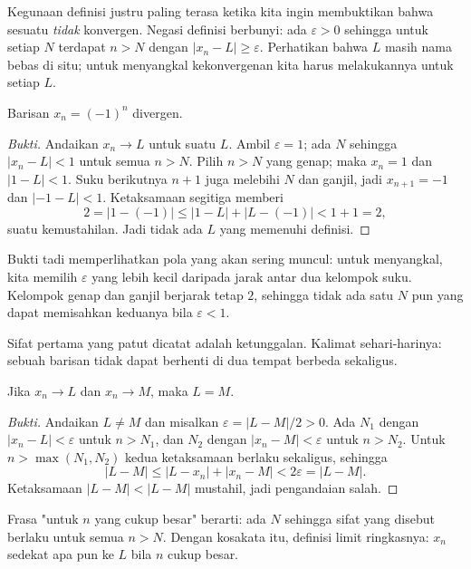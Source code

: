 Kegunaan definisi justru paling terasa ketika kita ingin membuktikan bahwa sesuatu
\emph{tidak} konvergen. Negasi definisi berbunyi: ada $\varepsilon>0$ sehingga untuk
setiap $N$ terdapat $n>N$ dengan $|x_n-L| \ge \varepsilon$. Perhatikan bahwa $L$
masih nama bebas di situ; untuk menyangkal kekonvergenan kita harus melakukannya
untuk setiap $L$.

\begin{contoh}
Barisan $x_n=(-1)^n$ divergen.
\end{contoh}

\begin{proof}[Bukti]
Andaikan $x_n \to L$ untuk suatu $L$. Ambil $\varepsilon=1$; ada $N$ sehingga
$|x_n-L|<1$ untuk semua $n>N$. Pilih $n>N$ yang genap; maka $x_n=1$ dan
$|1-L|<1$. Suku berikutnya $n+1$ juga melebihi $N$ dan ganjil, jadi $x_{n+1}=-1$
dan $|-1-L|<1$. Ketaksamaan segitiga memberi
\[
2 = |1-(-1)| \le |1-L| + |L-(-1)| < 1+1 = 2,
\]
suatu kemustahilan. Jadi tidak ada $L$ yang memenuhi definisi.
\end{proof}

Bukti tadi memperlihatkan pola yang akan sering muncul: untuk menyangkal, kita
memilih $\varepsilon$ yang lebih kecil daripada jarak antar dua kelompok suku.
Kelompok genap dan ganjil berjarak tetap $2$, sehingga tidak ada satu $N$ pun yang
dapat memisahkan keduanya bila $\varepsilon<1$.

Sifat pertama yang patut dicatat adalah ketunggalan. Kalimat sehari-harinya: sebuah
barisan tidak dapat berhenti di dua tempat berbeda sekaligus.

\begin{teorema}
Jika $x_n \to L$ dan $x_n \to M$, maka $L=M$.
\end{teorema}

\begin{proof}[Bukti]
Andaikan $L \neq M$ dan misalkan $\varepsilon=|L-M|/2>0$. Ada $N_1$ dengan
$|x_n-L|<\varepsilon$ untuk $n>N_1$, dan $N_2$ dengan $|x_n-M|<\varepsilon$ untuk
$n>N_2$. Untuk $n>\max(N_1,N_2)$ kedua ketaksamaan berlaku sekaligus, sehingga
\[
|L-M| \le |L-x_n| + |x_n-M| < 2\varepsilon = |L-M| .
\]
Ketaksamaan $|L-M|<|L-M|$ mustahil, jadi pengandaian salah.
\end{proof}

Frasa "untuk $n$ yang cukup besar" berarti: ada $N$ sehingga sifat yang disebut
berlaku untuk semua $n>N$. Dengan kosakata itu, definisi limit ringkasnya: $x_n$
sedekat apa pun ke $L$ bila $n$ cukup besar.

